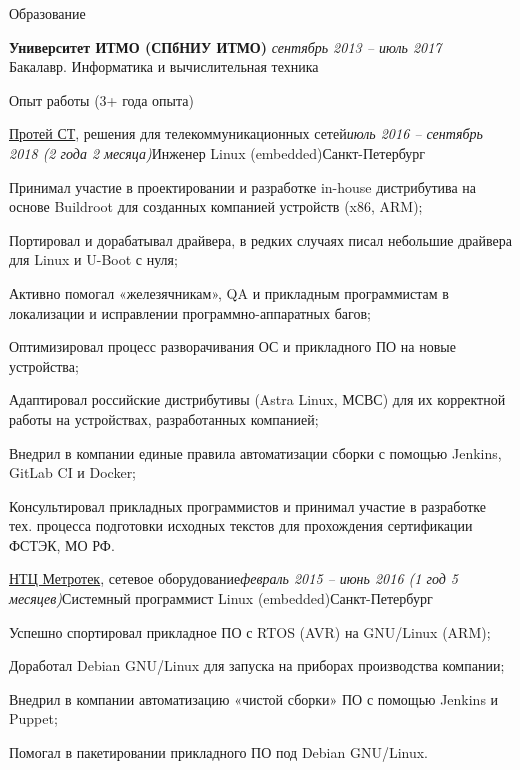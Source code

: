 \documentclass[hidelinks]{resume} %
\begin{document}
\begin{rSection}{Образование}

{\bf Университет ИТМО (СПбНИУ ИТМО)} \hfill {\em сентябрь 2013 -- июль 2017} \\
Бакалавр. Информатика и вычислительная техника
\end{rSection}


\begin{rSection}{Опыт работы (3+ года опыта)}


\begin{rSubsection}{\href{http://protei-st.ru}{Протей СТ}, решения для телекоммуникационных сетей}{\em июль 2016 -- сентябрь 2018 (2 года 2 месяца)}{Инженер Linux (embedded)}{Санкт-Петербург}
\item Принимал участие в проектировании и разработке in-house дистрибутива на основе Buildroot для созданных компанией устройств (x86, ARM);
\item Портировал и дорабатывал драйвера, в редких случаях писал небольшие драйвера для Linux и U-Boot с нуля;
\item Активно помогал «железячникам», QA и прикладным программистам в локализации и исправлении программно-аппаратных багов;
\item Оптимизировал процесс разворачивания ОС и прикладного ПО на новые устройства;
\item Адаптировал российские дистрибутивы (Astra Linux, МСВС) для их корректной работы на устройствах, разработанных компанией;
\item Внедрил в компании единые правила автоматизации сборки с помощью Jenkins, GitLab CI и Docker;
\item Консультировал прикладных программистов и принимал участие в разработке тех. процесса подготовки исходных текстов для прохождения сертификации ФСТЭК, МО РФ.
\end{rSubsection}


\begin{rSubsection}{\href{http://ntc.metrotek.ru}{НТЦ Метротек}, сетевое оборудование}{\em февраль 2015 -- июнь 2016 (1 год 5 месяцев)}{Системный программист Linux (embedded)}{Санкт-Петербург}
\item Успешно спортировал прикладное ПО с RTOS (AVR) на GNU/Linux (ARM);
\item Доработал Debian GNU/Linux для запуска на приборах производства компании;
\item Внедрил в компании автоматизацию «чистой сборки» ПО с помощью Jenkins и Puppet;
\item Помогал в пакетировании прикладного ПО под Debian GNU/Linux.
\end{rSubsection}


\end{rSection}
\end{document}
